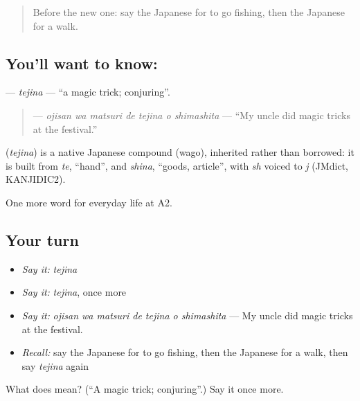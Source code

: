 \begin{quote}
Before the new one: say the Japanese for to go fishing, then the Japanese for a walk.
\end{quote}

\subsection*{You'll want to know: }
\textbf{} — \emph{tejina} — \textquotedblleft{}a magic trick; conjuring\textquotedblright{}.

\begin{quote}
\textbf{   } — \emph{ojisan wa matsuri de tejina o shimashita} — \textquotedblleft{}My uncle did magic tricks at the festival.\textquotedblright{}
\end{quote}

\begin{cousinweb}
\textbf{} (\emph{tejina}) is a native Japanese compound (wago), inherited rather than borrowed: it is built from \emph{te}, \textquotedblleft{}hand\textquotedblright{}, and \emph{shina}, \textquotedblleft{}goods, article\textquotedblright{}, with \emph{sh} voiced to \emph{j} (JMdict, KANJIDIC2).
\end{cousinweb}

\begin{grammarlens}[title={What you've built}]
One more word for everyday life at A2.
\end{grammarlens}

\subsection*{Your turn}
\begin{itemize}
\raggedright
  \item \emph{Say it:} \emph{tejina}
  \item \emph{Say it:} \emph{tejina}, once more
  \item \emph{Say it:} \emph{ojisan wa matsuri de tejina o shimashita} — My uncle did magic tricks at the festival.
  \item \emph{Recall:} say the Japanese for to go fishing, then the Japanese for a walk, then say \emph{tejina} again
\end{itemize}

\begin{tcolorbox}[breakable,colback=teal!4,colframe=teal!35!black,title={Before you move on}]
What does  mean? (\textquotedblleft{}A magic trick; conjuring\textquotedblright{}.) Say it once more.
\end{tcolorbox}
